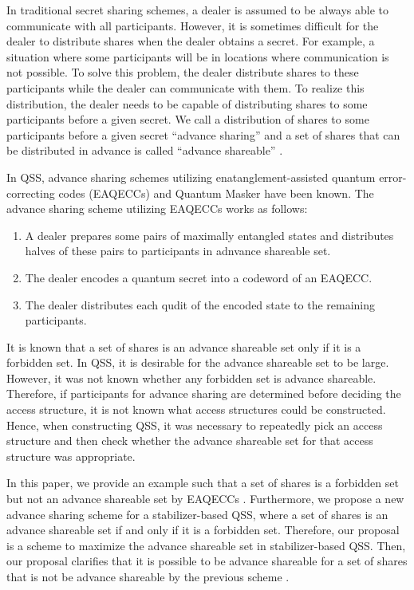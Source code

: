 \documentclass[11pt,a4paper]{article}
\theoremstyle{definition}
\begin{document}
In traditional secret sharing schemes, 
a dealer is assumed to be always able to communicate with all participants. 
However, it is sometimes difficult for the dealer to distribute shares 
when the dealer obtains a secret.
For example, a situation where some participants will be in locations where communication is not possible.
To solve this problem, the dealer distribute shares to these participants while the dealer can communicate with them. 
To realize this distribution, the dealer needs to be capable of distributing shares to some participants before a given secret.
We call a distribution of shares to some participants before a given secret ``advance sharing'' and a set of shares 
that can be distributed in advance is called ``advance shareable'' \cite{Miyajima_2022}. 

In QSS, advance sharing schemes utilizing enatanglement-assisted quantum error-correcting codes (EAQECCs) \cite{AdvanceSharing_Shibata,masumori2024advance} and Quantum Masker \cite{Lie_2020} have been known.
The advance sharing scheme utilizing EAQECCs works as follows:
\begin{enumerate}
    \item A dealer prepares some pairs of maximally entangled states and distributes halves of these pairs to participants in adnvance shareable set.
    \item The dealer encodes a quantum secret into a codeword of an EAQECC. 
    \item The dealer distributes each qudit of the encoded state to the remaining participants.
\end{enumerate}
It is known that a set of shares is an advance shareable set only if it is a forbidden set. 
In QSS, it is desirable for the advance shareable set to be large. 
However, it was not known whether any forbidden set is advance shareable. 
Therefore, if participants for advance sharing are determined before deciding the access structure, it is not known what access structures could be constructed.
Hence, when constructing QSS, it was necessary to repeatedly pick an access structure and then check whether the advance shareable set for that access structure was appropriate.

In this paper, we provide an example such that a set of shares is a forbidden set but not an advance shareable set by EAQECCs \cite{AdvanceSharing_Shibata}.
Furthermore, we propose a new advance sharing scheme for a stabilizer-based QSS, where a set of shares is an advance shareable set if and only if it is a forbidden set.
Therefore, our proposal is a scheme to maximize the advance shareable set in stabilizer-based QSS. 
Then, our proposal clarifies that it is possible to be advance shareable for a set of shares that is not be advance shareable by the previous scheme \cite{AdvanceSharing_Shibata}.
\end{document}
